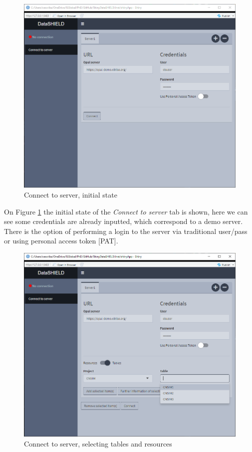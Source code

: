 \documentclass[
]{book}
\begin{document}
\begin{figure}

{\centering \includegraphics[width=12.71in]{images/data_entry1} 

}

\caption{Connect to server, initial state}\label{fig:dataentry1}
\end{figure}

On Figure \ref{fig:dataentry1} the initial state of the \emph{Connect to server} tab is shown, here we can see some credentials are already inputted, which correspond to a demo server. There is the option of performing a login to the server via traditional user/pass or using personal access token {[}PAT{]}.

\begin{figure}

{\centering \includegraphics[width=12.71in]{images/data_entry2} 

}

\caption{Connect to server, selecting tables and resources}\label{fig:dataentry2}
\end{figure}
\end{document}

